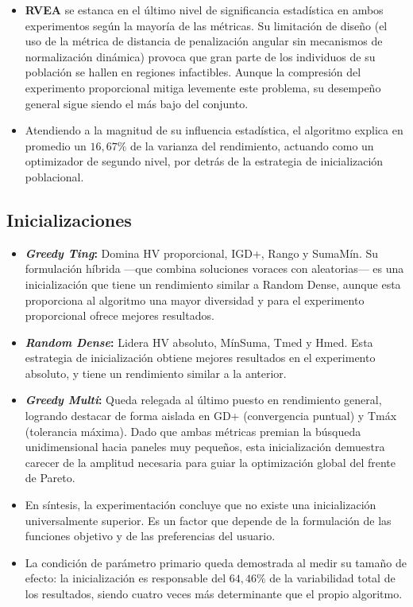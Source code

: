 \begin{itemize}
    \item \textbf{RVEA} se estanca en el último nivel de significancia estadística en ambos experimentos según la mayoría de las métricas. Su limitación de diseño (el uso de la métrica de distancia de penalización angular sin mecanismos de normalización dinámica) provoca que gran parte de los individuos de su población se hallen en regiones infactibles. Aunque la compresión del experimento proporcional mitiga levemente este problema, su desempeño general sigue siendo el más bajo del conjunto.
    \item Atendiendo a la magnitud de su influencia estadística, el algoritmo explica en promedio un $16{,}67\%$ de la varianza del rendimiento, actuando como un optimizador de segundo nivel, por detrás de la estrategia de inicialización poblacional.
\end{itemize}

\subsection{Inicializaciones}

\begin{itemize}
    \item \textbf{\textit{Greedy Ting}:} Domina HV proporcional, IGD+, Rango y SumaMín. Su formulación híbrida —que combina soluciones voraces con aleatorias— es una inicialización que tiene un rendimiento similar a Random Dense, aunque esta proporciona al algoritmo una mayor diversidad y para el experimento proporcional ofrece mejores resultados.
    \item \textbf{\textit{Random Dense}:} Lidera HV absoluto, MínSuma, Tmed y Hmed. Esta estrategia de inicialización obtiene mejores resultados en el experimento absoluto, y tiene un rendimiento similar a la anterior.
    \item \textbf{\textit{Greedy Multi}:} Queda relegada al último puesto en rendimiento general, logrando destacar de forma aislada en GD+ (convergencia puntual) y Tmáx (tolerancia máxima). Dado que ambas métricas premian la búsqueda unidimensional hacia paneles muy pequeños, esta inicialización demuestra carecer de la amplitud necesaria para guiar la optimización global del frente de Pareto.
    \item En síntesis, la experimentación concluye que no existe una inicialización universalmente superior. Es un factor que depende de la formulación de las funciones objetivo y de las preferencias del usuario.
    \item La condición de parámetro primario queda demostrada al medir su tamaño de efecto: la inicialización es responsable del $64{,}46\%$ de la variabilidad total de los resultados, siendo cuatro veces más determinante que el propio algoritmo.
\end{itemize}

